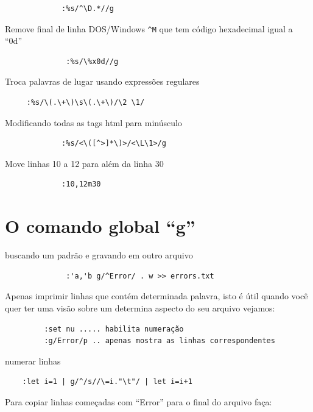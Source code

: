 \documentclass[10pt,a4paper,openany]{book}
\begin{document}
\begin{verbatim}
			 :%s/^\D.*//g
\end{verbatim}

Remove final de linha DOS/Windows \verb|^M| que tem código hexadecimal igual a
``0d''

\begin{verbatim}
			  :%s/\%x0d//g
\end{verbatim}

Troca palavras de lugar usando expressões regulares

\begin{verbatim}
	 :%s/\(.\+\)\s\(.\+\)/\2 \1/
\end{verbatim}

Modificando todas as tags html para minúsculo

\begin{verbatim}
			 :%s/<\([^>]*\)>/<\L\1>/g
\end{verbatim}

Move linhas 10 a 12 para além da linha 30

\begin{verbatim}
			 :10,12m30
\end{verbatim}

\section{O comando global ``g''}\label{sec:O comando global ``g''}

buscando um padrão e gravando em outro arquivo

\begin{verbatim}
			  :'a,'b g/^Error/ . w >> errors.txt
\end{verbatim}

Apenas imprimir linhas que contém determinada palavra, isto é útil 
quando você quer ter uma visão sobre um determina aspecto 
do seu arquivo vejamos:

\begin{verbatim}
		 :set nu ..... habilita numeração 
		 :g/Error/p .. apenas mostra as linhas correspondentes
\end{verbatim}

numerar linhas

\begin{verbatim}
	:let i=1 | g/^/s//\=i."\t"/ | let i=i+1
\end{verbatim}

Para copiar linhas começadas com ``Error'' para o final do arquivo faça:
\end{document}
